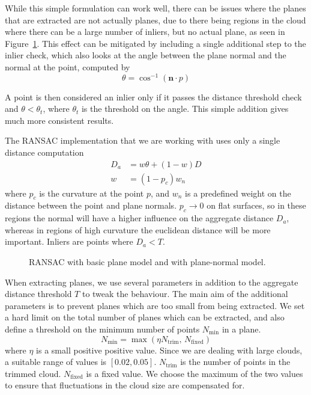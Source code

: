 \documentclass[11pt,a4paper]{kth-mag}
\begin{document}
While this simple formulation can work well, there can be issues where the
planes that are extracted are not actually planes, due to there being regions in
the cloud where there can be a large number of inliers, but no actual plane, as
seen in Figure~\ref{fig:planenormal}. This effect can be mitigated by including
a single additional step to the inlier check, which also looks at the angle
between the plane normal and the normal at the point, computed by
\begin{equation}
  \label{eq:5}
  \theta=\cos^{-1}(\mathbf{n}\cdot p)
\end{equation}

A point is then considered an inlier only if it passes the distance threshold
check and $\theta<\theta_t$, where $\theta_t$ is the threshold on the angle.
This simple addition gives much more consistent results.

The RANSAC implementation that we are working with uses only a single distance
computation
\begin{align}
  \label{eq:6}
  D_a&=w\theta + (1-w)D\\
  w&=(1-p_c)w_n
\end{align}
where $p_c$ is the curvature at the point $p$, and $w_n$ is a predefined weight
on the distance between the point and plane normals. $p_c\rightarrow 0$ on flat
surfaces, so in these regions the normal will have a higher influence on the
aggregate distance $D_a$, whereas in regions of high curvature the euclidean
distance will be more important. Inliers are points where $D_a<T$.

\begin{figure}
  \centering
  
  \caption{RANSAC with basic plane model and with plane-normal model.}
  \label{fig:planenormal}
\end{figure}

When extracting planes, we use several parameters in addition to the aggregate
distance threshold $T$ to tweak the behaviour. The main aim of the additional
parameters is to prevent planes which are too small from being extracted. We
set a hard limit on the total number of planes which can be extracted, and also
define a threshold on the minimum number of points $N_{\min}$ in a plane.
\begin{equation}
  \label{eq:7}
  N_{\min}=\max(\eta N_{\text{trim}},\, N_{\text{fixed}})
\end{equation}
where $\eta$ is a small positive positive value. Since we are dealing with large
clouds, a suitable range of values is $\left[0.02,0.05\right]$.
$N_{\text{trim}}$ is the number of points in the trimmed cloud.
$N_{\text{fixed}}$ is a fixed value. We choose the maximum of the two values to
ensure that fluctuations in the cloud size are compensated for.
\end{document}
